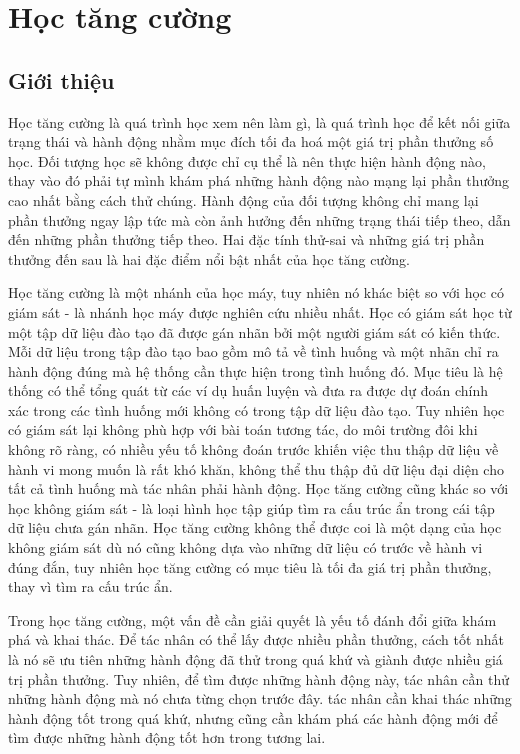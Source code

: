 \documentclass{uetgraduation}
\begin{document}
\section{Học tăng cường}
\subsection{Giới thiệu}
Học tăng cường là quá trình học xem nên làm gì, là quá trình học để kết nối giữa trạng thái và hành động nhằm mục đích tối đa hoá một giá trị phần thưởng số học. Đối tượng học sẽ không được chỉ cụ thể là
nên thực hiện hành động nào, thay vào đó phải tự mình khám phá những hành động nào mạng lại phần thưởng cao nhất bằng cách thử chúng. Hành động của đối tượng không chỉ mang lại phần thưởng ngay lập tức mà còn ảnh hưởng
đến những trạng thái tiếp theo, dẫn đến những phần thưởng tiếp theo. Hai đặc tính thử-sai và những giá trị phần thưởng đến sau là hai đặc điểm nổi bật nhất của học tăng cường.

Học tăng cường là một nhánh của học máy, tuy nhiên nó khác biệt so với học có giám sát - là nhánh học máy được nghiên cứu nhiều nhất. Học có giám sát học từ một tập dữ liệu đào tạo đã được gán nhãn
bởi một người giám sát có kiến thức. Mỗi dữ liệu trong tập đào tạo bao gồm mô tả về tình huống và một nhãn chỉ ra hành động đúng mà hệ thống cần thực hiện trong tình huống đó. Mục tiêu là hệ thống
có thể tổng quát từ các ví dụ huấn luyện và đưa ra được dự đoán chính xác trong các tình huống mới không có trong tập dữ liệu đào tạo. Tuy nhiên học có giám sát lại không phù hợp với bài toán tương
tác, do môi trường đôi khi không rõ ràng, có nhiều yếu tố không đoán trước khiến việc thu thập dữ liệu về hành vi mong muốn là rất khó khăn, không thể thu thập đủ dữ liệu đại diện cho tất cả tình huống
mà tác nhân phải hành động. Học tăng cường cũng khác so với học không giám sát - là loại hình học tập giúp tìm ra cấu trúc ẩn trong cái tập dữ liệu chưa gán nhãn. Học tăng cường không thể được coi là
một dạng của học không giám sát dù nó cũng không dựa vào những dữ liệu có trước về hành vi đúng đắn, tuy nhiên học tăng cường có mục tiêu là tối đa giá trị phần thưởng, thay vì tìm ra cấu trúc ẩn.

Trong học tăng cường, một vấn đề cần giải quyết là yếu tố đánh đổi giữa khám phá và khai thác. Để tác nhân có thể lấy được nhiều phần thưởng, cách tốt nhất là nó sẽ ưu tiên những hành động đã thử trong
quá khứ và giành được nhiều giá trị phần thưởng. Tuy nhiên, để tìm được những hành động này, tác nhân cần thử những hành động mà nó chưa từng chọn trước đây. tác nhân cần khai thác những hành động tốt trong
quá khứ, nhưng cũng cần khám phá các hành động mới để tìm được những hành động tốt hơn trong tương lai.
\end{document}
